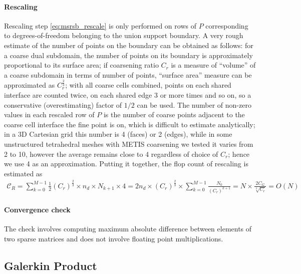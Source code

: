 \paragraph{Rescaling}
Rescaling step \cref{eq:msrsb_rescale} is only performed on rows of $P$ corresponding to degrees-of-freedom belonging to the union support boundary.   A very rough estimate of the number of points on the boundary can be obtained as follows: for a coarse dual subdomain, the number of points on its boundary is approximately proportional to its surface area; if coarsening ratio $C_r$ is a measure of ``volume'' of a coarse subdomain in terms of number of points, ``surface area'' measure can be approximated as $C_r^{\frac{2}{3}}$; with all coarse cells combined, points on each shared interface are counted twice, on each shared edge 3 or more times and so on, so a conservative (overestimating) factor of $1/2$ can be used.   The number of non-zero values in each rescaled row of $P$ is the number of coarse points adjacent to the coarse cell interface the fine point is on, which is difficult to estimate analytically; in a 3D Cartesian grid this number is 4 (faces) or 2 (edges), while in some unstructured tetrahedral meshes with METIS coarsening we tested it varies from 2 to 10, however the average remains close to 4 regardless of choice of $C_r$; hence we use 4 as an approximation.   Putting it together, the flop count of rescaling is estimated as
\begin{align}
    \mathcal{C}_{R} = \sum\limits_{k=0}^{M-1}\frac{1}{2}(C_r)^{\frac{2}{3}} \times n_d \times N_{k+1} \times 4 = 2 n_d \times (C_r)^{\frac{2}{3}} \times \sum\limits_{k=0}^{M-1}\frac{N_0}{(C_r)^{k+1}} = N \times \frac{2C_G}{\sqrt[3]{C_r}} = O(N) \label{eq:complexity_rescale}
\end{align}

\paragraph{Convergence check}
The check involves computing maximum absolute difference between elements of two sparse matrices and does not involve floating point multiplications.

\subsection{Galerkin Product}

